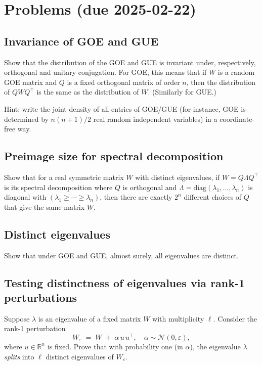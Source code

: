 \documentclass[letterpaper,11pt,oneside,reqno]{article}
\numberwithin{equation}{section}
\theoremstyle{definition}
\begin{document}
\appendix
\setcounter{section}{2}

\section{Problems (due 2025-02-22)}

\subsection{Invariance of GOE and GUE}
\label{prob:invariance_GOE_GUE}

Show that the distribution of the GOE and GUE is
invariant under, respectively, orthogonal and unitary conjugation.
For GOE, this means that if \(W\)
is a random GOE matrix and \(Q\) is a fixed orthogonal
matrix of order $n$, then the distribution
of \(QWQ^\top\) is the same as the distribution of \(W\).
(Similarly for GUE.)

\medskip
\noindent
Hint: write the joint density of all entries of GOE/GUE (for instance, GOE
is determined by $n(n+1)/2$ real random independent variables)
in a coordinate-free way.


\subsection{Preimage size for spectral decomposition}
\label{prob:GOE-preimage}

Show that for a real symmetric matrix $W$ with distinct eigenvalues,
if $W=Q\Lambda Q^\top$ is its spectral decomposition
where $Q$ is orthogonal and $\Lambda=\mathrm{diag}(\lambda_1,\ldots,\lambda_n)$
is diagonal with $(\lambda_1\ge \cdots\ge \lambda_n)$,
then there are exactly $2^n$ different choices of $Q$
that give the same matrix $W$.

\subsection{Distinct eigenvalues}
\label{prob:distinct-eigenvalues}

Show that under GOE and GUE, almost surely,
all eigenvalues are distinct.


\subsection{Testing distinctness of eigenvalues via rank-1 perturbations}
\label{prob:distinct-eigs-rank1}
  Suppose \(\lambda\) is an eigenvalue of a fixed matrix
	\(W\) with multiplicity \(\ell\). Consider the rank-1 perturbation
  \[
     W_{\varepsilon} \;=\; W \;+\;\alpha \, u \, u^\top,
     \quad \alpha \sim \mathcal{N}(0,\varepsilon),
  \]
  where \(u \in \mathbb{R}^n\) is fixed. Prove that with probability one (in \(\alpha\)), the eigenvalue \(\lambda\) \emph{splits} into \(\ell\) distinct eigenvalues of \(W_{\varepsilon}\).
\end{document}
